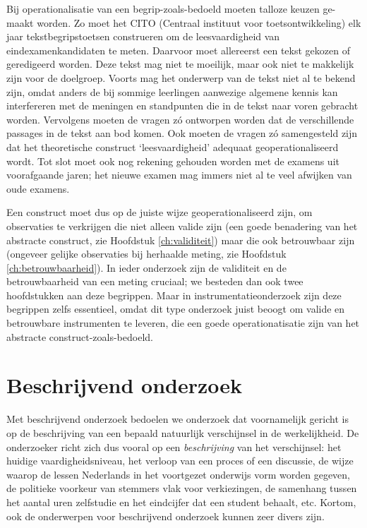 \documentclass[
]{book}
\begin{document}
Bij operationalisatie van een begrip-zoals-bedoeld moeten talloze keuzen
ge-maakt worden. Zo moet het CITO (Centraal instituut voor
toetsontwikkeling) elk jaar tekstbegripstoetsen construeren om de
leesvaardigheid van eindexamenkandidaten te meten. Daarvoor moet
allereerst een tekst gekozen of geredigeerd worden. Deze tekst mag niet
te moeilijk, maar ook niet te makkelijk zijn voor de doelgroep. Voorts
mag het onderwerp van de tekst niet al te bekend zijn, omdat anders de
bij sommige leerlingen aanwezige algemene kennis kan interfereren met de
meningen en standpunten die in de tekst naar voren gebracht worden.
Vervolgens moeten de vragen zó ontworpen worden dat de verschillende
passages in de tekst aan bod komen. Ook moeten de vragen zó samengesteld
zijn dat het theoretische construct `leesvaardigheid' adequaat
geoperationaliseerd wordt. Tot slot moet ook nog rekening gehouden
worden met de examens uit voorafgaande jaren; het nieuwe examen mag
immers niet al te veel afwijken van oude examens.

Een construct moet dus op de juiste wijze geoperationaliseerd zijn, om
observaties te verkrijgen die niet alleen valide zijn (een goede
benadering van het abstracte construct, zie Hoofdstuk \ref{ch:validiteit})
maar die ook betrouwbaar zijn (ongeveer
gelijke observaties bij herhaalde meting, zie
Hoofdstuk \ref{ch:betrouwbaarheid}).
In ieder onderzoek zijn de validiteit
en de betrouwbaarheid van een meting cruciaal; we besteden dan ook twee hoofdstukken aan deze begrippen.
Maar in instrumentatieonderzoek zijn
deze begrippen zelfs essentieel, omdat dit type onderzoek juist beoogt
om valide en betrouwbare instrumenten te leveren, die een goede
operationatisatie zijn van het abstracte construct-zoals-bedoeld.

\hypertarget{sec:beschrijvend-onderzoek}{%
\section{Beschrijvend onderzoek}\label{sec:beschrijvend-onderzoek}}

Met beschrijvend onderzoek bedoelen we onderzoek dat voornamelijk
gericht is op de beschrijving van een bepaald natuurlijk verschijnsel in
de werkelijkheid. De onderzoeker richt zich dus vooral op een
\emph{beschrijving} van het verschijnsel: het huidige vaardigheidsniveau, het
verloop van een proces of een discussie, de wijze waarop de lessen
Nederlands in het voortgezet onderwijs vorm worden gegeven, de politieke
voorkeur van stemmers vlak voor verkiezingen, de samenhang tussen het
aantal uren zelfstudie en het eindcijfer dat een student behaalt, etc.
Kortom, ook de onderwerpen voor beschrijvend onderzoek kunnen zeer
divers zijn.
\end{document}
